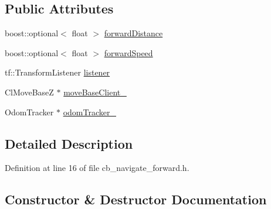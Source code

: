 \subsection*{Public Attributes}
\begin{DoxyCompactItemize}
\item 
boost\+::optional$<$ float $>$ \hyperlink{classsm__dance__bot_1_1move__base__z__client_1_1CbNavigateForward_a2c1a04f86c3a0c40d516654fa0b4944a}{forward\+Distance}
\item 
boost\+::optional$<$ float $>$ \hyperlink{classsm__dance__bot_1_1move__base__z__client_1_1CbNavigateForward_a19b51c72123731c4f0557f1a723e37fb}{forward\+Speed}
\item 
tf\+::\+Transform\+Listener \hyperlink{classsm__dance__bot_1_1move__base__z__client_1_1CbNavigateForward_ada990a8520ff4e8e4051e7043958c636}{listener}
\item 
Cl\+Move\+BaseZ $\ast$ \hyperlink{classsm__dance__bot_1_1move__base__z__client_1_1CbNavigateForward_a75d6a72a4ac20fb718723fc9f98efae2}{move\+Base\+Client\+\_\+}
\item 
Odom\+Tracker $\ast$ \hyperlink{classsm__dance__bot_1_1move__base__z__client_1_1CbNavigateForward_ad383206447b313d604e6645041a6cfc4}{odom\+Tracker\+\_\+}
\end{DoxyCompactItemize}


\subsection{Detailed Description}


Definition at line 16 of file cb\+\_\+navigate\+\_\+forward.\+h.



\subsection{Constructor \& Destructor Documentation}
